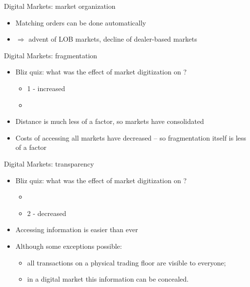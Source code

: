 \documentclass[english,10pt
,aspectratio=169
]{beamer}
\begin{document}
\begin{frame}{Digital Markets: market organization}
	\begin{itemize}
		\item Matching orders can be done automatically
		\item $\Rightarrow$ advent of LOB markets, decline of dealer-based markets
	\end{itemize}
\end{frame}


\begin{frame}{Digital Markets: fragmentation}
	\begin{itemize}
		\item \alert{Bliz quiz}: what was the effect of market digitization on ?
		\begin{itemize}
			\item {1 - increased}
			\item {}
		\end{itemize}
		\pause
		\item Distance is much less of a factor, so markets have consolidated
		\item Costs of accessing all markets have decreased -- so fragmentation itself is less of a factor
	\end{itemize}
\end{frame}


\begin{frame}{Digital Markets: transparency}
	\begin{itemize}
		\item \alert{Bliz quiz}: what was the effect of market digitization on ?
		\begin{itemize}
			\item {}
			\item {2 - decreased}
		\end{itemize}
		\pause
		\item Accessing information is easier than ever
		\item Although some exceptions possible:
		\begin{itemize}
			\item all transactions on a physical trading floor are visible to everyone;
			\item in a digital market this information can be concealed.
		\end{itemize}
	\end{itemize}
\end{frame}
\end{document}
